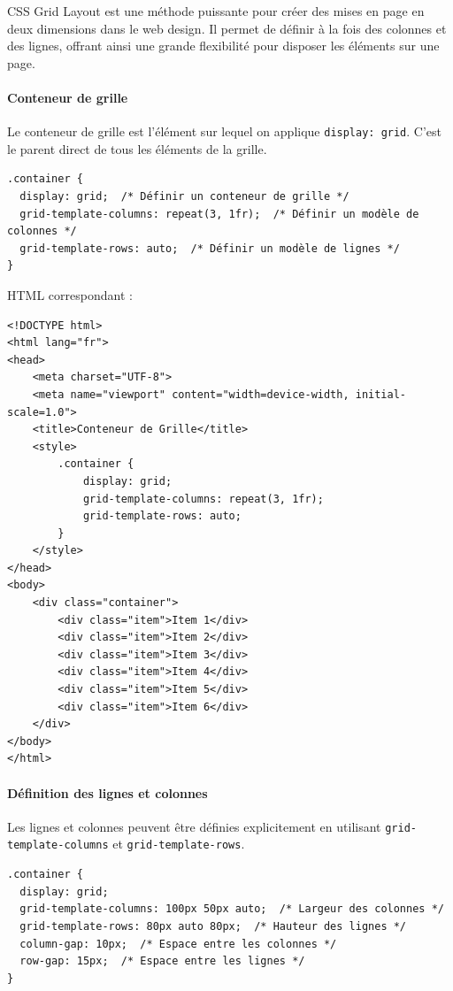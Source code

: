 \documentclass{report}
\begin{document}
\begin{multicols*}{2}
CSS Grid Layout est une méthode puissante pour créer des mises en page en deux dimensions dans le web design. Il permet de définir à la fois des colonnes et des lignes, offrant ainsi une grande flexibilité pour disposer les éléments sur une page.







\paragraph{Conteneur de grille}
Le conteneur de grille est l'élément sur lequel on applique \texttt{display: grid}. C'est le parent direct de tous les éléments de la grille.

\begin{lstlisting}[style=CSSDraculaLight]
.container {
  display: grid;  /* Définir un conteneur de grille */
  grid-template-columns: repeat(3, 1fr);  /* Définir un modèle de colonnes */
  grid-template-rows: auto;  /* Définir un modèle de lignes */
}
\end{lstlisting}

HTML correspondant :
\begin{lstlisting}[style=HTMLDraculaDark]
<!DOCTYPE html>
<html lang="fr">
<head>
    <meta charset="UTF-8">
    <meta name="viewport" content="width=device-width, initial-scale=1.0">
    <title>Conteneur de Grille</title>
    <style>
        .container {
            display: grid;
            grid-template-columns: repeat(3, 1fr);
            grid-template-rows: auto;
        }
    </style>
</head>
<body>
    <div class="container">
        <div class="item">Item 1</div>
        <div class="item">Item 2</div>
        <div class="item">Item 3</div>
        <div class="item">Item 4</div>
        <div class="item">Item 5</div>
        <div class="item">Item 6</div>
    </div>
</body>
</html>
\end{lstlisting}

\paragraph{Définition des lignes et colonnes}
Les lignes et colonnes peuvent être définies explicitement en utilisant \texttt{grid-template-columns} et \texttt{grid-template-rows}.

\begin{lstlisting}[style=CSSDraculaLight]
.container {
  display: grid;
  grid-template-columns: 100px 50px auto;  /* Largeur des colonnes */
  grid-template-rows: 80px auto 80px;  /* Hauteur des lignes */
  column-gap: 10px;  /* Espace entre les colonnes */
  row-gap: 15px;  /* Espace entre les lignes */
}
\end{lstlisting}


\end{multicols*}
\end{document}
